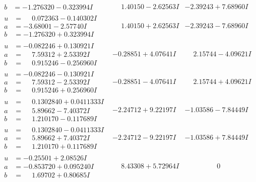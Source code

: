 \documentclass[1p]{elsarticle_modified}
\theoremstyle{definition}
\begin{document}
$$\begin{array}{c|c|c}
\begin{aligned}
b &= -1.276320 - 0.323994 I\end{aligned}
 & \phantom{-}1.40150 - 2.62563 I & -2.39243 + 7.68960 I \\ \hline\begin{aligned}
u &= \phantom{-}0.072363 - 0.140302 I \\
a &= -3.68001 - 2.57740 I \\
b &= -1.276320 + 0.323994 I\end{aligned}
 & \phantom{-}1.40150 + 2.62563 I & -2.39243 - 7.68960 I \\ \hline\begin{aligned}
u &= -0.082246 + 0.130921 I \\
a &= \phantom{-}7.59312 + 2.53392 I \\
b &= \phantom{-}0.915246 - 0.256960 I\end{aligned}
 & -0.28851 + 4.07641 I & \phantom{-}2.15744 - 4.09621 I \\ \hline\begin{aligned}
u &= -0.082246 - 0.130921 I \\
a &= \phantom{-}7.59312 - 2.53392 I \\
b &= \phantom{-}0.915246 + 0.256960 I\end{aligned}
 & -0.28851 - 4.07641 I & \phantom{-}2.15744 + 4.09621 I \\ \hline\begin{aligned}
u &= \phantom{-}0.1302840 + 0.0411333 I \\
a &= \phantom{-}5.89662 - 7.40372 I \\
b &= \phantom{-}1.210170 - 0.117689 I\end{aligned}
 & -2.24712 + 9.22197 I & -1.03586 - 7.84449 I \\ \hline\begin{aligned}
u &= \phantom{-}0.1302840 - 0.0411333 I \\
a &= \phantom{-}5.89662 + 7.40372 I \\
b &= \phantom{-}1.210170 + 0.117689 I\end{aligned}
 & -2.24712 - 9.22197 I & -1.03586 + 7.84449 I \\ \hline\begin{aligned}
u &= -0.25501 + 2.08526 I \\
a &= -0.853720 + 0.095240 I \\
b &= \phantom{-}1.69702 + 0.80685 I\end{aligned}
 & \phantom{-}8.43308 + 5.72964 I & \phantom{-0.000000 } 0 \\ \hline\begin{aligned}

\end{aligned}
\end{array}$$
\end{document}
